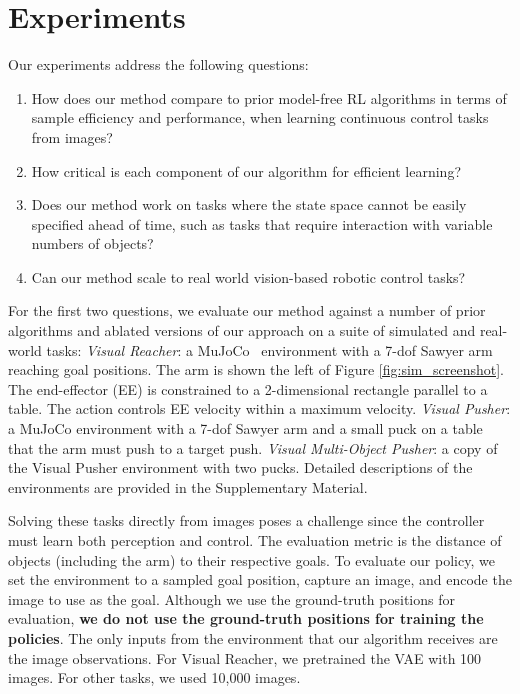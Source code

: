 \section{Experiments}\label{sec:experiments}
Our experiments address the following questions:
\begin{enumerate}
    \item How does our method compare to prior model-free RL algorithms in terms of sample efficiency and performance, when learning continuous control tasks from images?
    \item How critical is each component of our algorithm for efficient learning?
    \item Does our method work on tasks where the state space cannot be easily specified ahead of time, such as tasks that require interaction with variable numbers of objects?
    \item Can our method scale to real world vision-based robotic control tasks?
\end{enumerate}
For the first two questions, we evaluate our method against a number of prior algorithms and ablated versions of our approach on a suite of simulated and real-world tasks:
\textit{Visual Reacher}: a MuJoCo~\citep{todorov12mujoco} environment with a 7-dof Sawyer arm reaching goal positions.
The arm is shown the left of Figure \ref{fig:sim_screenshot}.
The end-effector (EE) is constrained to a 2-dimensional rectangle parallel to a table.
The action controls EE velocity within a maximum velocity.
\textit{Visual Pusher}: a MuJoCo environment with a 7-dof Sawyer arm and a small puck on a table that the arm must push to a target push.
\textit{Visual Multi-Object Pusher}: a copy of the Visual Pusher environment with two pucks.
Detailed descriptions of the environments are provided in the Supplementary Material.

Solving these tasks directly from images poses a challenge since the controller must learn both perception and control.
The evaluation metric is the distance of objects (including the arm) to their respective goals.
To evaluate our policy, we set the environment to a sampled goal position, capture an image, and encode the image to use as the goal.
Although we use the ground-truth positions for evaluation, \textbf{we do not use the ground-truth positions for training the policies}.
The only inputs from the environment that our algorithm receives are the image observations.
For Visual Reacher, we pretrained the VAE with 100 images.
For other tasks, we used 10,000 images.

